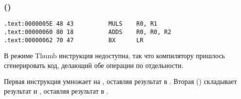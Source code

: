 \subsubsection{\OptimizingKeilVI (\ThumbMode)}

\begin{lstlisting}[label=ARM_leaf_example2,style=customasmARM]
.text:0000005E 48 43          MULS    R0, R1
.text:00000060 80 18          ADDS    R0, R0, R2
.text:00000062 70 47          BX      LR
\end{lstlisting}

В режиме Thumb инструкция  недоступна, так что компилятору пришлось сгенерировать код, 
делающий обе операции по отдельности.

Первая инструкция  умножает  на , оставляя результат в .
Вторая () складывает результат и , оставляя результат в .

